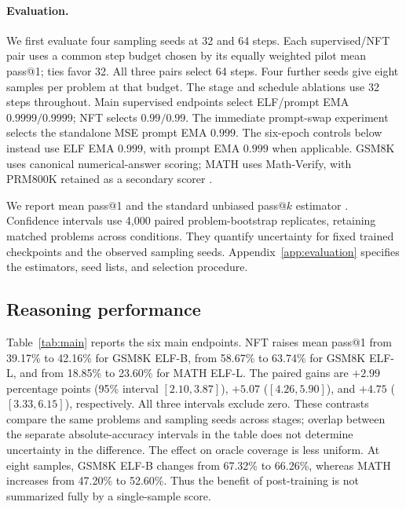 \paragraph{Evaluation.}
We first evaluate four sampling seeds at 32 and 64 steps. Each supervised/NFT pair uses a common step budget chosen by its equally weighted pilot mean pass@1; ties favor 32. All three pairs select 64 steps. Four further seeds give eight samples per problem at that budget. The stage and schedule ablations use 32 steps throughout. Main supervised endpoints select ELF/prompt EMA $0.9999/0.9999$; NFT selects $0.99/0.99$. The immediate prompt-swap experiment selects the standalone MSE prompt EMA $0.999$. The six-epoch controls below instead use ELF EMA $0.999$, with prompt EMA $0.999$ when applicable. GSM8K uses canonical numerical-answer scoring; MATH uses Math-Verify, with PRM800K retained as a secondary scorer \citep{mathverify,prm800k}.

We report mean pass@1 and the standard unbiased pass@$k$ estimator \citep{codex}. Confidence intervals use 4,000 paired problem-bootstrap replicates, retaining matched problems across conditions. They quantify uncertainty for fixed trained checkpoints and the observed sampling seeds. Appendix~\ref{app:evaluation} specifies the estimators, seed lists, and selection procedure.

\subsection{Reasoning performance}

Table~\ref{tab:main} reports the six main endpoints. NFT raises mean pass@1 from 39.17\% to 42.16\% for GSM8K ELF-B, from 58.67\% to 63.74\% for GSM8K ELF-L, and from 18.85\% to 23.60\% for MATH ELF-L. The paired gains are $+2.99$ percentage points (95\% interval $[2.10,3.87]$), $+5.07$ ($[4.26,5.90]$), and $+4.75$ ($[3.33,6.15]$), respectively. All three intervals exclude zero. These contrasts compare the same problems and sampling seeds across stages; overlap between the separate absolute-accuracy intervals in the table does not determine uncertainty in the difference. The effect on oracle coverage is less uniform. At eight samples, GSM8K ELF-B changes from 67.32\% to 66.26\%, whereas MATH increases from 47.20\% to 52.60\%. Thus the benefit of post-training is not summarized fully by a single-sample score.


